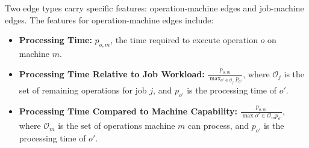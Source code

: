 Two edge types carry specific features: operation-machine edges and job-machine edges. The features for operation-machine edges include:

\begin{itemize}
    \item \textbf{Processing Time:} $p_{o,m}$, the time required to execute operation $o$ on machine $m$.
    \item \textbf{Processing Time Relative to Job Workload:} $\frac{p_{o,m}}{\max_{o' \in \mathcal{O}_j} p_{o'}}$, where $\mathcal{O}_j$ is the set of remaining operations for job $j$, and $p_{o'}$ is the processing time of $o'$.
    \item \textbf{Processing Time Compared to Machine Capability:} $\frac{p_{o,m}}{\max{o' \in \mathcal{O}_m} p_{o'}}$, where $\mathcal{O}_m$ is the set of operations machine $m$ can process, and $p_{o'}$ is the processing time of $o'$.
\end{itemize}
